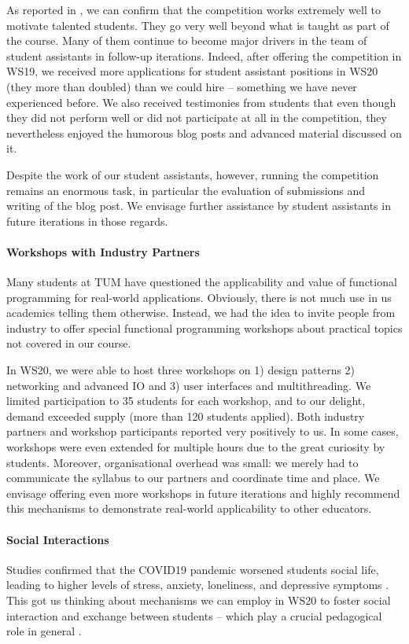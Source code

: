 As reported in \cite{next_1100},
we can confirm that the competition works extremely well to motivate talented students.
They go very well beyond what is taught as part of the course.
Many of them continue to become major drivers in
the team of student assistants in follow-up iterations.
Indeed, after offering the competition in WS19,
we received more applications for student assistant positions in WS20 (they more than doubled) than we could hire -- something we have never experienced before.
We also received testimonies from students that even though they did not perform well or did not participate at all in the competition,
they nevertheless enjoyed the humorous blog posts and advanced material discussed on it.

Despite the work of our student assistants,
however,
running the competition remains an enormous task,
in particular the evaluation of submissions and
writing of the blog post.
We envisage further assistance by student assistants in future iterations in those regards.

\paragraph{Workshops with Industry Partners}
Many students at TUM have questioned the applicability and value of functional programming for real-world applications.
Obviously, there is not much use in us academics telling
them otherwise.
Instead, we had the idea to invite people from industry
to offer special functional programming workshops about
practical topics not covered in our course.

In WS20,
we were able to host three workshops on 1) design patterns
2) networking and advanced IO and 3) user interfaces and multithreading.
We limited participation to 35 students for each workshop,
and to our delight, demand exceeded supply (more than 120 students applied).
Both industry partners and workshop participants
reported very positively to us.
In some cases,
workshops were even extended for multiple hours due to the great curiosity by students.
Moreover, organisational overhead was small:
we merely had to communicate the syllabus to our partners and coordinate time and place.
We envisage offering even more workshops in future iterations and highly recommend this mechanisms to demonstrate real-world applicability to other educators.

\paragraph{Social Interactions}
Studies confirmed that the COVID19 pandemic
worsened students social life,
leading to higher levels of stress, anxiety, loneliness, and depressive symptoms \cite{students_lockdown1}.
This got us thinking about mechanisms we
can employ in WS20 to foster social interaction and exchange between students
-- which play a crucial pedagogical role in general .

